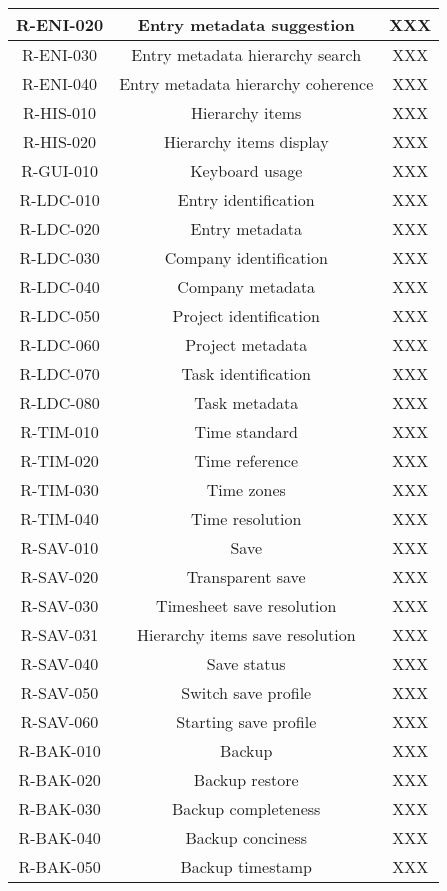 \begin{longtable}{| c | c | c |}
  R-ENI-020 & Entry metadata suggestion & XXX \\ \hline
  R-ENI-030 & Entry metadata hierarchy search & XXX \\ \hline
  R-ENI-040 & Entry metadata hierarchy coherence & XXX \\ \hline
  R-HIS-010 & Hierarchy items & XXX \\ \hline
  R-HIS-020 & Hierarchy items display & XXX \\ \hline
  R-GUI-010 & Keyboard usage & XXX \\ \hline
  R-LDC-010 & Entry identification & XXX \\ \hline
  R-LDC-020 & Entry metadata & XXX \\ \hline
  R-LDC-030 & Company identification & XXX \\ \hline
  R-LDC-040 & Company metadata & XXX \\ \hline
  R-LDC-050 & Project identification & XXX \\ \hline
  R-LDC-060 & Project metadata & XXX \\ \hline
  R-LDC-070 & Task identification & XXX \\ \hline
  R-LDC-080 & Task metadata & XXX \\ \hline
  R-TIM-010 & Time standard & XXX \\ \hline
  R-TIM-020 & Time reference & XXX \\ \hline
  R-TIM-030 & Time zones & XXX \\ \hline
  R-TIM-040 & Time resolution & XXX \\ \hline
  R-SAV-010 & Save & XXX \\ \hline
  R-SAV-020 & Transparent save & XXX \\ \hline
  R-SAV-030 & Timesheet save resolution & XXX \\ \hline
  R-SAV-031 & Hierarchy items save resolution & XXX \\ \hline
  R-SAV-040 & Save status & XXX \\ \hline
  R-SAV-050 & Switch save profile & XXX \\ \hline
  R-SAV-060 & Starting save profile & XXX \\ \hline
  R-BAK-010 & Backup & XXX \\ \hline
  R-BAK-020 & Backup restore & XXX \\ \hline
  R-BAK-030 & Backup completeness & XXX \\ \hline
  R-BAK-040 & Backup conciness & XXX \\ \hline
  R-BAK-050 & Backup timestamp & XXX \\ \hline

\end{longtable}

